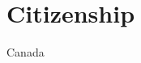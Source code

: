 \documentclass[11pt]{article} %
\begin{document}
\section*{Citizenship}

Canada

%
%



\vfill %
\end{document}
